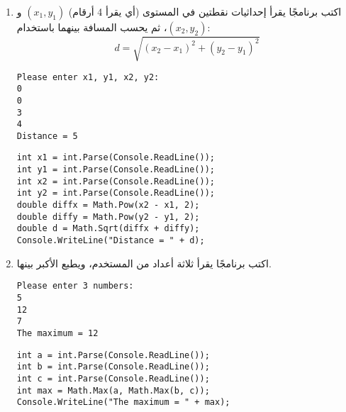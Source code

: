 \documentclass[12pt]{article}
\begin{document}
\begin{enumerate}[itemsep=3em]
    \item
    اكتب برنامجًا يقرأ إحداثيات نقطتين في المستوى (أي يقرأ 4 أرقام) $(x_1, y_1)$ و $(x_2, y_2)$،
    ثم يحسب المسافة بينهما باستخدام:
    $$d = \sqrt{(x_2 - x_1)^2 + (y_2 - y_1)^2}$$
    \ifdetailed
    \begin{example}
    \begin{english}
    \begin{lstlisting}
Please enter x1, y1, x2, y2:
0
0
3
4
Distance = 5
    \end{lstlisting}
    \end{english}
    \end{example}
    \ifwithsols
    \begin{solution}
    \begin{english}
    \begin{lstlisting}
int x1 = int.Parse(Console.ReadLine());
int y1 = int.Parse(Console.ReadLine());
int x2 = int.Parse(Console.ReadLine());
int y2 = int.Parse(Console.ReadLine());
double diffx = Math.Pow(x2 - x1, 2);
double diffy = Math.Pow(y2 - y1, 2);
double d = Math.Sqrt(diffx + diffy);
Console.WriteLine("Distance = " + d);
    \end{lstlisting}
    \end{english}
    \end{solution}
    \fi
    \clearpage
\fi

    \item
    اكتب برنامجًا يقرأ ثلاثة أعداد من المستخدم، ويطبع الأكبر بينها.
    \ifdetailed
    \begin{example}
    \begin{english}
    \begin{lstlisting}
Please enter 3 numbers:
5
12
7
The maximum = 12
    \end{lstlisting}
    \end{english}
    \end{example}
    \ifwithsols
    \begin{solution}
    \begin{english}
    \begin{lstlisting}
int a = int.Parse(Console.ReadLine());
int b = int.Parse(Console.ReadLine());
int c = int.Parse(Console.ReadLine());
int max = Math.Max(a, Math.Max(b, c));
Console.WriteLine("The maximum = " + max);
    \end{lstlisting}
    \end{english}
    \end{solution}
    \fi
\fi


\end{enumerate}
\end{document}
